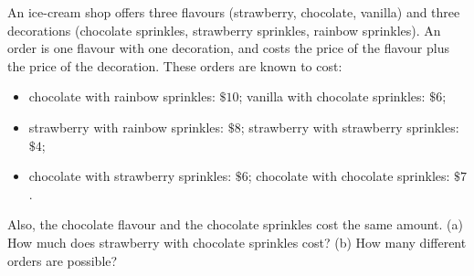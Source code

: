 An ice-cream shop offers three flavours (strawberry, chocolate, vanilla) and three decorations (chocolate sprinkles, strawberry sprinkles, rainbow sprinkles). An order is one flavour with one decoration, and costs the price of the flavour plus the price of the decoration. These orders are known to cost:
\begin{itemize}
\item chocolate with rainbow sprinkles: $\$10$; vanilla with chocolate sprinkles: $\$6$;
\item strawberry with rainbow sprinkles: $\$8$; strawberry with strawberry sprinkles: $\$4$;
\item chocolate with strawberry sprinkles: $\$6$; chocolate with chocolate sprinkles: $\$7$.
\end{itemize}
Also, the chocolate flavour and the chocolate sprinkles cost the same amount. (a) How much does strawberry with chocolate sprinkles cost? (b) How many different orders are possible?
